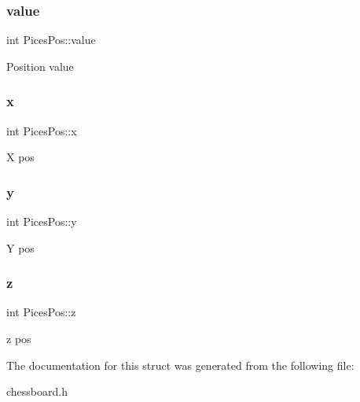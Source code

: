 \subsubsection{\texorpdfstring{value}{value}}
{\footnotesize\ttfamily int Pices\+Pos\+::value}

Position value \mbox{\label{struct_pices_pos_acb1106796cffe0be268d0520a204656d}} 
\subsubsection{\texorpdfstring{x}{x}}
{\footnotesize\ttfamily int Pices\+Pos\+::x}

X pos \mbox{\label{struct_pices_pos_a72146b86f290ee233d93a483d07f1922}} 
\subsubsection{\texorpdfstring{y}{y}}
{\footnotesize\ttfamily int Pices\+Pos\+::y}

Y pos \mbox{\label{struct_pices_pos_a195acdcf09f1c447e48975aed219f5be}} 
\subsubsection{\texorpdfstring{z}{z}}
{\footnotesize\ttfamily int Pices\+Pos\+::z}

z pos 

The documentation for this struct was generated from the following file\+:\begin{DoxyCompactItemize}
\item 
chessboard.\+h\end{DoxyCompactItemize}
